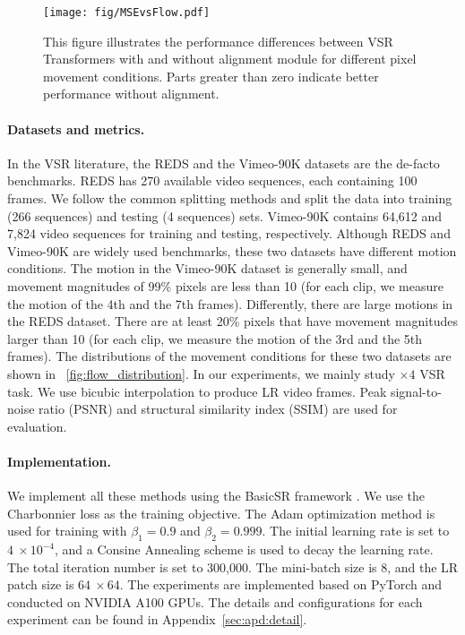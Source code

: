 \documentclass{article}
\begin{document}
\begin{figure}[t]
    \centering
    \texttt{[image: fig/MSEvsFlow.pdf]}
    \vspace{-5mm}
    \caption{This figure illustrates the performance differences between VSR Transformers with and without alignment module for different pixel movement conditions. Parts greater than zero indicate better performance without alignment.}
    \label{fig:mse_v_flow}
    \vspace{-6mm}
\end{figure}


\vspace{-4mm}
\paragraph{Datasets and metrics.}
\label{sec:exp_setup}
In the VSR literature, the REDS \cite{nah2019ntire} and the Vimeo-90K \cite{xue2019video} datasets are the de-facto benchmarks.
REDS has 270 available video sequences, each containing 100 frames.
We follow the common splitting methods and split the data into training (266 sequences) and testing (4 sequences) sets.
Vimeo-90K contains 64,612 and 7,824 video sequences for training and testing, respectively.
Although REDS and Vimeo-90K are widely used benchmarks, these two datasets have different motion conditions.
The motion in the Vimeo-90K dataset is generally small, and movement magnitudes of 99\% pixels are less than 10 (for each clip, we measure the motion of the 4th and the 7th frames).
Differently, there are large motions in the REDS dataset.
There are at least 20\% pixels that have movement magnitudes larger than 10 (for each clip, we measure the motion of the 3rd and the 5th frames).
The distributions of the movement conditions for these two datasets are shown in \figurename~\ref{fig:flow_distribution}.
In our experiments, we mainly study $\times4$ VSR task.
We use bicubic interpolation to produce LR video frames.
Peak signal-to-noise ratio (PSNR) and structural similarity index (SSIM) are used for evaluation.



\vspace{-3mm}
\paragraph{Implementation.}
We implement all these methods using the BasicSR framework \cite{wang2020basicsr}.
We use the Charbonnier loss \cite{lai2017deep} as the training objective.
The Adam optimization \cite{kingma2014adam} method is used for training with $\beta_1=0.9$ and $\beta_2=0.999$. 
The initial learning rate is set to $4~\times 10^{-4}$, and a Consine Annealing scheme \cite{loshchilov2016sgdr} is used to decay the learning rate.
The total iteration number is set to 300,000.
The mini-batch size is 8, and the LR patch size is $64~\times 64$.
The experiments are implemented based on PyTorch \cite{paszke2019pytorch} and conducted on NVIDIA A100 GPUs.
The details and configurations for each experiment can be found in Appendix~\ref{sec:apd:detail}.
\end{document}
